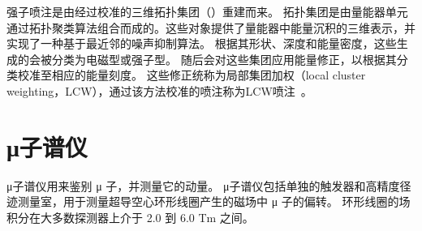 强子喷注是由经过校准的三维拓扑集团（\topos）重建而来。
拓扑集团是由量能器单元通过拓扑聚类算法组合而成的。这些对象提供了量能器中能量沉积的三维表示，并实现了一种基于最近邻的噪声抑制算法。
根据其形状、深度和能量密度，这些生成的\topos 会被分类为电磁型或强子型。
随后会对这些集团应用能量修正，以根据其分类校准至相应的能量刻度。
这些修正统称为局部集团加权（local cluster weighting，LCW），通过该方法校准的喷注称为LCW喷注~\cite{Boccardi:1411357}。

\section{μ子谱仪}
μ子谱仪用来鉴别 μ 子，并测量它的动量。
μ子谱仪包括单独的触发器和高精度径迹测量室，用于测量超导空心环形线圈产生的磁场中 μ 子的偏转。
环形线圈的场积分在大多数探测器上介于 2.0 到 6.0 Tm 之间。

